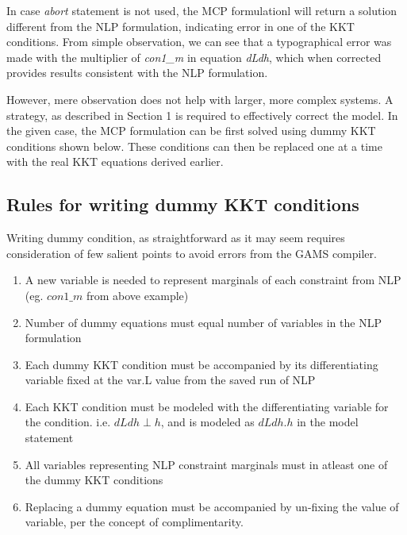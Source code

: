 \documentclass{article}
\begin{document}



\noindent In case \textit{abort} statement is not used, the MCP formulationl will return a solution different from the NLP formulation, indicating
error in one of the KKT conditions. From simple observation, we can see that a typographical error was made with the multiplier of \textit{con1\_m}
in equation \textit{dLdh}, which when corrected provides results consistent with the NLP formulation.

However, mere observation does not help with larger, more complex  systems. A strategy, as described in Section 1 is required to effectively correct the model.
In the given case, the MCP formulation can be first solved using dummy KKT conditions shown below. These conditions can then be replaced
one at a time with the real KKT equations derived earlier.



\subsection{Rules for writing dummy KKT conditions}

Writing dummy condition, as straightforward as it may seem requires consideration of few salient points to avoid errors from the GAMS compiler.

\begin{enumerate}
	\item A new variable is needed to represent marginals of each constraint from NLP (eg. $con1\_m$ from above example)
  \item Number of dummy equations must equal number of variables in the NLP formulation
	\item Each dummy KKT condition must be accompanied by its differentiating variable fixed at the var.L value from the saved run of NLP
	\item Each KKT condition must be modeled with the differentiating variable for the condition. i.e. $dLdh \perp h$,
        and is modeled as $dLdh.h$ in the model statement
	\item All variables representing NLP constraint marginals must in atleast one of the dummy KKT conditions
  \item Replacing a dummy equation must be accompanied by un-fixing the value of variable, per the concept of complimentarity.

\end{enumerate}
\end{document}
